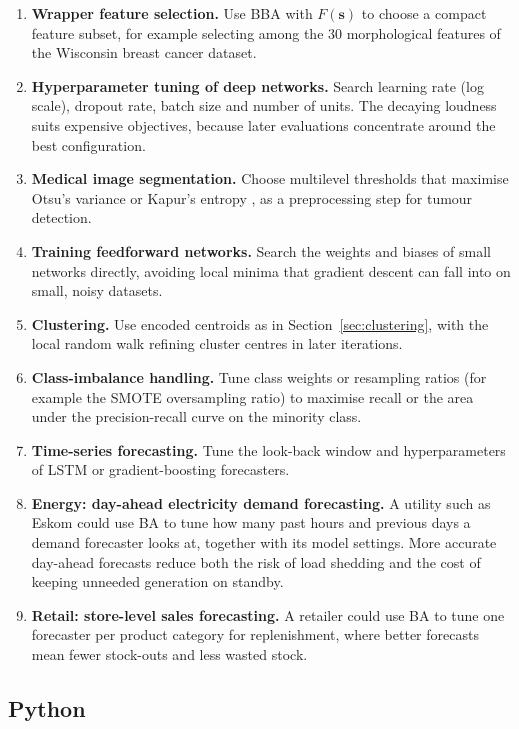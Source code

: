 \documentclass[11pt,a4paper]{article}
\newcommand{\vect}[1]{\mathbf{#1}}
\begin{document}
\begin{enumerate}
  \item \textbf{Wrapper feature selection.} Use BBA with $F(\vect{s})$ to choose a compact feature subset, for example selecting among the 30 morphological features of the Wisconsin breast cancer dataset.
  \item \textbf{Hyperparameter tuning of deep networks.} Search learning rate (log scale), dropout rate, batch size and number of units. The decaying loudness suits expensive objectives, because later evaluations concentrate around the best configuration.
  \item \textbf{Medical image segmentation.} Choose multilevel thresholds that maximise Otsu's variance or Kapur's entropy \citep{kapur1985}, as a preprocessing step for tumour detection.
  \item \textbf{Training feedforward networks.} Search the weights and biases of small networks directly, avoiding local minima that gradient descent can fall into on small, noisy datasets.
  \item \textbf{Clustering.} Use encoded centroids as in Section~\ref{sec:clustering}, with the local random walk refining cluster centres in later iterations.
  \item \textbf{Class-imbalance handling.} Tune class weights or resampling ratios (for example the SMOTE oversampling ratio) to maximise recall or the area under the precision-recall curve on the minority class.
  \item \textbf{Time-series forecasting.} Tune the look-back window and hyperparameters of LSTM or gradient-boosting forecasters.
  \item \textbf{Energy: day-ahead electricity demand forecasting.} A utility such as Eskom could use BA to tune how many past hours and previous days a demand forecaster looks at, together with its model settings. More accurate day-ahead forecasts reduce both the risk of load shedding and the cost of keeping unneeded generation on standby.
  \item \textbf{Retail: store-level sales forecasting.} A retailer could use BA to tune one forecaster per product category for replenishment, where better forecasts mean fewer stock-outs and less wasted stock.
\end{enumerate}

\subsection{Python}
\end{document}
